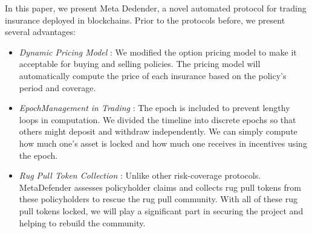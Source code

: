 In this paper, we present Meta Dedender, a novel automated protocol for trading insurance deployed in blockchains.
Prior to the protocols before, we present several advantages:

\begin{itemize}
	\item \textit{Dynamic Pricing Model} : We modified the option pricing model to make it acceptable for buying and selling policies.
	The pricing model will automatically compute the price of each insurance based on the policy's period and coverage.
	\item \textit{EpochManagement in Trading} : The epoch is included to prevent lengthy loops in computation.
	We divided the timeline into discrete epochs so that others might deposit and withdraw independently.
	We can simply compute how much one's asset is locked and how much one receives in incentives using the epoch.
	\item \textit{Rug Pull Token Collection} : Unlike other risk-coverage protocols.
	MetaDefender assesses policyholder claims and collects rug pull tokens from these policyholders to rescue the rug pull community.
	With all of these rug pull tokens locked, we will play a significant part in securing the project and helping to rebuild the community.
\end{itemize}